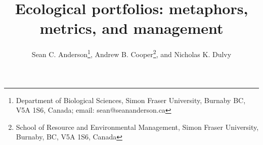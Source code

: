 \documentclass[11pt]{article}
\title{Ecological portfolios: metaphors,\\metrics, and management}
\author{Sean C. Anderson\thanks{Department of Biological Sciences, Simon Fraser
    University, Burnaby BC, V5A 1S6, Canada; email: sean@seananderson.ca},
  Andrew B. Cooper\thanks{School of Resource and Environmental Management,
    Simon Fraser University, Burnaby, BC, V5A 1S6, Canada},
  and Nicholas K. Dulvy\footnotemark[1]}
\date{}
\begin{document}
\maketitle

\linenumbers
\modulolinenumbers[5]
\begin{spacing}{1.2}


\clearpage

\clearpage

\clearpage

\clearpage

\clearpage


\end{spacing}
\end{document}
